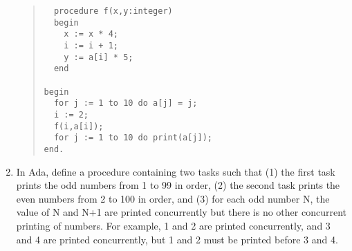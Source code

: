 \documentclass[11pt]{article}
\begin{document}
\begin{enumerate}
\begin{quote}
\begin{verbatim}
  procedure f(x,y:integer)
  begin
    x := x * 4;
    i := i + 1;
    y := a[i] * 5;
  end

begin
  for j := 1 to 10 do a[j] = j;
  i := 2;
  f(i,a[i]);
  for j := 1 to 10 do print(a[j]);
end.
\end{verbatim}\end{quote}


\item 

  In Ada, define a procedure containing two tasks such that (1) the first task prints the
  odd numbers from 1 to 99 in order, (2) the second task prints the even numbers
  from 2 to 100 in order, and (3) for each odd number N, the value of N and N+1 are
  printed concurrently but there is no other concurrent printing of numbers.  For example,
  1 and 2 are printed concurrently, and 3 and 4 are printed concurrently, but 1 and 2 must
  be printed before 3 and 4.

\end{enumerate} 
\end{document}
